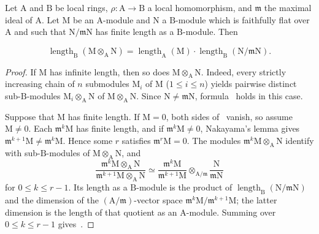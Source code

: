 \begin{lemma}[2.5.5.2]
\label{IV.2.5.5.2}
Let $\mathrm{A}$ and $\mathrm{B}$ be local rings,
$\rho:\mathrm{A}\to\mathrm{B}$ a local homomorphism, and
$\mathfrak{m}$ the maximal ideal of $\mathrm{A}$. Let $\mathrm{M}$ be an
$\mathrm{A}$-module and $\mathrm{N}$ a $\mathrm{B}$-module which is
faithfully flat over $\mathrm{A}$ and such that
$\mathrm{N}/\mathfrak{m}\mathrm{N}$ has finite length as a
$\mathrm{B}$-module. Then
\end{lemma}

\begin{env}[2.5.5.3]
\label{IV.2.5.5.3}
\[
  \operatorname{length}_{\mathrm{B}}(\mathrm{M}\otimes_{\mathrm{A}}\mathrm{N}) = \operatorname{length}_{\mathrm{A}}(\mathrm{M})\cdot\operatorname{length}_{\mathrm{B}}(\mathrm{N}/\mathfrak{m}\mathrm{N}).
\]
\end{env}

\begin{proof}
If $\mathrm{M}$ has infinite length, then so does
$\mathrm{M}\otimes_{\mathrm{A}}\mathrm{N}$. Indeed, every strictly
increasing chain of $n$ submodules $\mathrm{M}_i$ of $\mathrm{M}$
\textnormal{(}$1\leq i\leq n$\textnormal{)} yields pairwise distinct
sub-$\mathrm{B}$-modules
$\mathrm{M}_i\otimes_{\mathrm{A}}\mathrm{N}$ of
$\mathrm{M}\otimes_{\mathrm{A}}\mathrm{N}$. Since
$\mathrm{N}\neq\mathfrak{m}\mathrm{N}$, formula~
holds in this case.

Suppose that $\mathrm{M}$ has finite length. If $\mathrm{M}=0$, both
sides of~ vanish, so assume $\mathrm{M}\neq0$. Each
$\mathfrak{m}^k\mathrm{M}$ has finite length, and if
$\mathfrak{m}^k\mathrm{M}\neq0$, Nakayama's lemma gives
$\mathfrak{m}^{k+1}\mathrm{M}\neq\mathfrak{m}^k\mathrm{M}$. Hence some
$r$ satisfies $\mathfrak{m}^r\mathrm{M}=0$. The modules
$\mathfrak{m}^k\mathrm{M}\otimes_{\mathrm{A}}\mathrm{N}$ identify with
sub-$\mathrm{B}$-modules of
$\mathrm{M}\otimes_{\mathrm{A}}\mathrm{N}$, and
\[
 \frac{\mathfrak{m}^k\mathrm{M}\otimes_{\mathrm{A}}\mathrm{N}}
      {\mathfrak{m}^{k+1}\mathrm{M}\otimes_{\mathrm{A}}\mathrm{N}}
 \simeq
 \frac{\mathfrak{m}^k\mathrm{M}}{\mathfrak{m}^{k+1}\mathrm{M}}
 \otimes_{\mathrm{A}/\mathfrak{m}}
 \frac{\mathrm{N}}{\mathfrak{m}\mathrm{N}}
\]
for $0\leq k\leq r-1$. Its length as a $\mathrm{B}$-module is the
product of
$\operatorname{length}_{\mathrm{B}}(\mathrm{N}/\mathfrak{m}\mathrm{N})$
and the dimension of the $(\mathrm{A}/\mathfrak{m})$-vector space
$\mathfrak{m}^k\mathrm{M}/\mathfrak{m}^{k+1}\mathrm{M}$; the latter
dimension is the length of that quotient as an $\mathrm{A}$-module.
Summing over $0\leq k\leq r-1$ gives~.
\end{proof}

